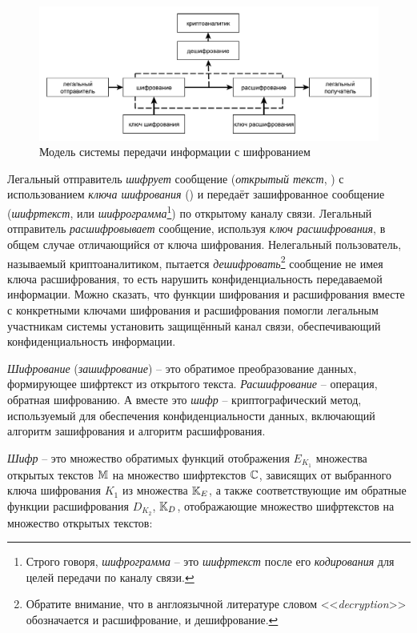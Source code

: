 \begin{figure}[!thb]
	\centering
	\includegraphics[width=1.0\textwidth]{pic/model-cipher}
	\caption{Модель системы передачи информации с шифрованием\label{pic:model-cipher}}
\end{figure}

Легальный отправитель \emph{шифрует} сообщение (\emph{открытый текст}, ) с использованием \emph{ключа шифрования} () и передаёт зашифрованное сообщение (\emph{шифртекст},  или \emph{шифрограмма}\footnote{Строго говоря, \emph{шифрограмма} -- это \emph{шифртекст} после его \emph{кодирования} для целей передачи по каналу связи.}) по открытому каналу связи. Легальный отправитель \emph{расшифровывает} сообщение, используя \emph{ключ расшифрования}, в общем случае отличающийся от ключа шифрования. Нелегальный пользователь, называемый криптоаналитиком, пытается \emph{дешифровать}\footnote{Обратите внимание, что в англоязычной литературе словом <<\textit{decryption}>> обозначается и расшифрование, и дешифрование.} сообщение не имея ключа расшифрования, то есть нарушить конфиденциальность передаваемой информации. Можно сказать, что функции шифрования и расшифрования вместе с конкретными ключами шифрования и расшифрования помогли легальным участникам системы установить защищённый канал связи, обеспечивающий конфиденциальность информации.

\emph{Шифрование} (\emph{зашифрование}) -- это обратимое преобразование данных, формирующее шифртекст из открытого текста. \emph{Расшифрование} -- операция, обратная шифрованию. А вместе это \emph{шифр} -- криптографический метод, используемый для обеспечения конфиденциальности данных, включающий алгоритм зашифрования и алгоритм расшифрования.~\cite{GOST-89}

\emph{Шифр} -- это множество обратимых функций отображения $E_{K_1}$ множества открытых текстов $\mathbb{M}$ на множество шифртекстов $\mathbb{C}$, зависящих от выбранного ключа шифрования $K_1$ из множества $\mathbb{K}_E$, а также соответствующие им обратные функции расшифрования $D_{K_2}$, $\mathbb{K}_D$, отображающие множество шифртекстов на множество открытых текстов:

